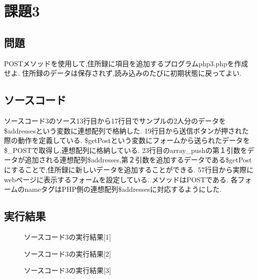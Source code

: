 \documentclass[a4j,10pt]{jsarticle}
\begin{document}

\section{課題3}

\subsection{問題}

POSTメソッドを使用して,住所録に項目を追加するプログラムphp3.phpを作成せよ.
住所録のデータは保存されず,読み込みのたびに初期状態に戻ってよい.

\subsection{ソースコード}


ソースコード3のソース13行目から17行目でサンプルの2人分のデータを\$addressesという変数に連想配列で格納した.
19行目から送信ボタンが押された際の動作を定義している. \$getPostという変数にフォームから送られたデータを\$\_POSTで取得し,連想配列に格納している.
23行目のarray\_pushの第１引数をデータが追加される連想配列\$addresses,第２引数を追加するデータである\$getPostにすることで,住所録に新しいデータを追加することができる.
57行目から実際にwebページに表示するフォームを設定している. メソッドはPOSTである.
各フォームのnameタグはPHP側の連想配列\$addressesに対応するようにした.




\subsection{実行結果}

\begin{figure}[H]
  \centering
  \caption{ソースコード3の実行結果[1]}
\label{fig:fig3}
\end{figure}

\begin{figure}[H]
  \centering
  \caption{ソースコード3の実行結果[2]}
\label{fig:fig4}
\end{figure}

\begin{figure}[H]
  \centering
  \caption{ソースコード3の実行結果[3]}
\label{fig:fig5}
\end{figure}
\end{document}
